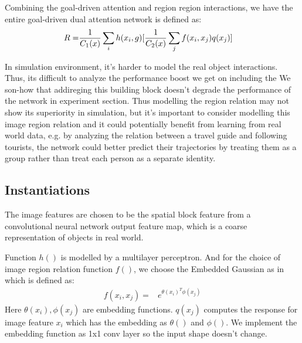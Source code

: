 \documentclass[10pt,twocolumn,letterpaper]{article}
\begin{document}
Combining the goal-driven attention and region region interactions, we have the entire goal-driven dual attention network is defined as:
\begin{equation}
\begin{aligned}
    R =& {1 \over C_1(x)} \sum_i h(x_i, g) [ {1 \over C_2(x)} \sum_j f(x_i, x_j) q(x_j)]
\end{aligned}
\end{equation}

In simulation environment, it's harder to model the real object interactions. Thus, its difficult to analyze the performance boost we get on including the We son-how that addireging this building block doesn't degrade the performance of the network in experiment section. 
Thus modelling the region relation may not show its superiority in simulation, but it's important to consider modelling this image region relation and it could potentially benefit from learning from real world data, e.g. by analyzing the relation between a travel guide and following tourists, the network could better predict their trajectories by treating them as a group rather than treat each person as a separate identity. 

\subsection{Instantiations}
The image features are chosen to be the spatial block feature from a convolutional neural network output feature map, which is a coarse representation of objects in real world. 

Function $h()$ is modelled by a multilayer perceptron. And for the choice of image region relation function $f()$, we choose the Embedded Gaussian as in \cite{wang_non-local_2017} which is defined as:
\begin{equation}
\begin{aligned}
    f(x_i, x_j) =& e^{\theta(x_i)^T \phi(x_j)}
\end{aligned}
\end{equation}
Here $\theta(x_i), \phi(x_j)$ are embedding functions. $q(x_j)$ computes the response for image feature $x_i$ which has the embedding as $\theta()$ and $\phi()$. We implement the embedding function as 1x1 conv layer so the input shape doesn't change. 
\end{document}
